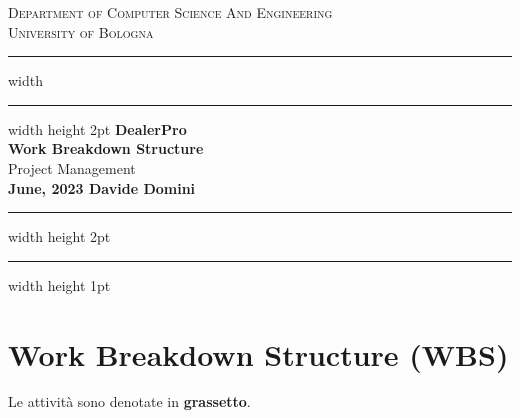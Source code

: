 \documentclass{article}
\begin{document}
\begin{titlepage}

  \newcommand{\HRule}{\rule{\linewidth}{0.5mm}}
  \center
  
  \textsc{\Large Department of Computer Science And Engineering}\\[0.5cm]
  
  \textsc{\Large University of Bologna}\\[0.6cm]
  
  \hrule width \hsize \kern 1mm \hrule width \hsize height 2pt 
  \vspace{0.8cm}
  { \large \bfseries DealerPro}\\[0.6cm]
  { \large \bfseries Work Breakdown Structure}\\[0.6cm]
  { \large Project Management}\\[0.6cm]
  
  
  {\bfseries{June, 2023}
  \hfill
  \bfseries{Davide Domini}}\\[0.6cm]
  
  \hrule width \hsize height 2pt \kern 1mm \hrule width \hsize height 1pt
  \vspace{0.4cm}
  
  \end{titlepage}

  \clearpage
  
  \section{Work Breakdown Structure (WBS)}

  Le attività sono denotate in \textbf{grassetto}.
\end{document}
